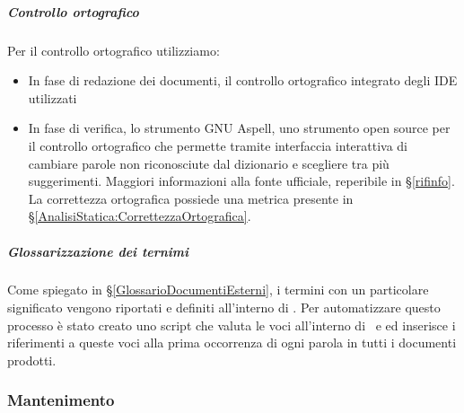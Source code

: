 			\subparagraph{Controllo ortografico}
			Per il controllo ortografico utilizziamo:
			\begin{itemize}
				\item In fase di redazione dei documenti, il controllo ortografico integrato degli IDE utilizzati
				\item In fase di verifica, lo strumento GNU Aspell, uno strumento open source per il controllo ortografico che permette tramite interfaccia interattiva di cambiare parole non riconosciute dal dizionario e scegliere tra più suggerimenti. Maggiori informazioni alla fonte ufficiale, reperibile in \S\ref{rifinfo}.
				La correttezza ortografica possiede una metrica presente in \S\ref{AnalisiStatica:CorrettezzaOrtografica}.
			\end{itemize}
        
            \subparagraph{Glossarizzazione dei ternimi}
            Come spiegato in \S\ref{GlossarioDocumentiEsterni}, i termini con un particolare significato vengono riportati e definiti all'interno di \Gld. Per automatizzare questo processo è stato creato uno script che valuta le voci all'interno di \Gld\ e ed inserisce i riferimenti a queste voci alla prima occorrenza di ogni parola in tutti i documenti prodotti.

		\subsubsection{Mantenimento}\label{Mantenimento}


